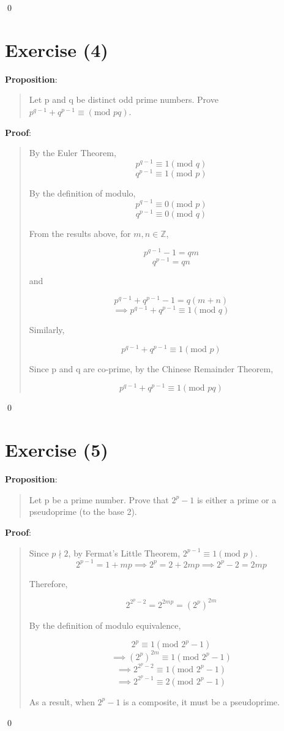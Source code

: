 \documentclass{article} %
\begin{document}
\qed
\bigskip

\section*{Exercise (4)}

\bigskip
\noindent
\textbf{Proposition}:
\begin{quote}
    Let p and q be distinct odd prime numbers. Prove $p^{q-1} + q^{p-1} \equiv (\text{mod }pq)$.
\end{quote}

\bigskip
\noindent
\textbf{Proof}:
\begin{quote}
    By the Euler Theorem,
    \[p^{q-1} \equiv 1 (\text{mod }q)\]
    \[q^{p-1} \equiv 1 (\text{mod }p)\]

    By the definition of modulo,
    \[p^{q-1} \equiv 0 (\text{mod }p)\]
    \[q^{p-1} \equiv 0 (\text{mod }q)\]

    From the results above, for $m, n \in \mathbb{Z}$,

    \[p^{q-1} - 1 = qm\]
    \[q^{p - 1} = qn\]

    and

    \[p^{q-1} + q^{p-1} - 1 = q (m + n)\]
    \[\implies p^{q-1} + q^{p-1} \equiv 1 (\text{mod }q)\]

    Similarly,

    \[p^{q-1} + q^{p-1} \equiv 1 (\text{mod }p)\]

    Since p and q are co-prime, by the Chinese Remainder Theorem,

    \[p^{q-1} + q^{p-1} \equiv 1 (\text{mod }pq)\]

\end{quote}
\qed
\bigskip

\section*{Exercise (5)}

\bigskip
\noindent
\textbf{Proposition}:
\begin{quote}
    Let p be a prime number. Prove that $2^p - 1$ is either a prime or a pseudoprime (to the base 2).
\end{quote}

\bigskip
\noindent
\textbf{Proof}:
\begin{quote}
    Since $p \nmid 2$, by Fermat's Little Theorem, $2^{p - 1} \equiv 1 (\text{mod }p)$.
    \[2^{p-1} = 1 + mp \implies 2^p = 2 + 2 mp \implies 2^p - 2 = 2mp\]

    Therefore,

    \[2^{2^p - 2} = 2^{2mp} = (2^{p})^{2m}\]

    By the definition of modulo equivalence,

    \[2^p \equiv 1(\text{mod }2^p - 1)\]
    \[\implies (2^{p})^{2m} \equiv 1 (\text{mod }2^p - 1)\]
    \[\implies 2^{2^p - 2} \equiv 1 (\text{mod }2^p - 1)\]
    \[\implies 2^{2^p - 1} \equiv 2 (\text{mod }2^p - 1)\]

    As a result, when $2^p - 1$ is a composite, it must be a pseudoprime.
\end{quote}
\qed
\bigskip
\end{document}

